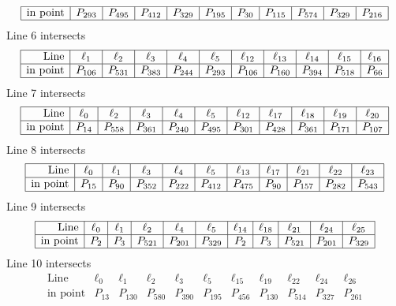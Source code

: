 \documentclass{article}
\begin{document}
{$$\begin{array}{|r*{10}{|c}|}
\hline
\mbox{in point}  & P_{293} & P_{495} & P_{412} & P_{329} & P_{195} & P_{30} & P_{115} & P_{574} & P_{329} & P_{216}\\
\hline
\end{array}
$$
Line 6 intersects 
$$
\begin{array}{|r*{10}{|c}|}
\hline
\mbox{Line}  & \ell_{1} & \ell_{2} & \ell_{3} & \ell_{4} & \ell_{5} & \ell_{12} & \ell_{13} & \ell_{14} & \ell_{15} & \ell_{16}\\
\hline
\mbox{in point}  & P_{106} & P_{531} & P_{383} & P_{244} & P_{293} & P_{106} & P_{160} & P_{394} & P_{518} & P_{66}\\
\hline
\end{array}
$$
Line 7 intersects 
$$
\begin{array}{|r*{10}{|c}|}
\hline
\mbox{Line}  & \ell_{0} & \ell_{2} & \ell_{3} & \ell_{4} & \ell_{5} & \ell_{12} & \ell_{17} & \ell_{18} & \ell_{19} & \ell_{20}\\
\hline
\mbox{in point}  & P_{14} & P_{558} & P_{361} & P_{240} & P_{495} & P_{301} & P_{428} & P_{361} & P_{171} & P_{107}\\
\hline
\end{array}
$$
Line 8 intersects 
$$
\begin{array}{|r*{10}{|c}|}
\hline
\mbox{Line}  & \ell_{0} & \ell_{1} & \ell_{3} & \ell_{4} & \ell_{5} & \ell_{13} & \ell_{17} & \ell_{21} & \ell_{22} & \ell_{23}\\
\hline
\mbox{in point}  & P_{15} & P_{90} & P_{352} & P_{222} & P_{412} & P_{475} & P_{90} & P_{157} & P_{282} & P_{543}\\
\hline
\end{array}
$$
Line 9 intersects 
$$
\begin{array}{|r*{10}{|c}|}
\hline
\mbox{Line}  & \ell_{0} & \ell_{1} & \ell_{2} & \ell_{4} & \ell_{5} & \ell_{14} & \ell_{18} & \ell_{21} & \ell_{24} & \ell_{25}\\
\hline
\mbox{in point}  & P_{2} & P_{3} & P_{521} & P_{201} & P_{329} & P_{2} & P_{3} & P_{521} & P_{201} & P_{329}\\
\hline
\end{array}
$$
Line 10 intersects 
$$
\begin{array}{|r*{10}{|c}|}
\hline
\mbox{Line}  & \ell_{0} & \ell_{1} & \ell_{2} & \ell_{3} & \ell_{5} & \ell_{15} & \ell_{19} & \ell_{22} & \ell_{24} & \ell_{26}\\
\hline
\mbox{in point}  & P_{13} & P_{130} & P_{580} & P_{390} & P_{195} & P_{456} & P_{130} & P_{514} & P_{327} & P_{261}\\

\end{array}$$}
\end{document}
